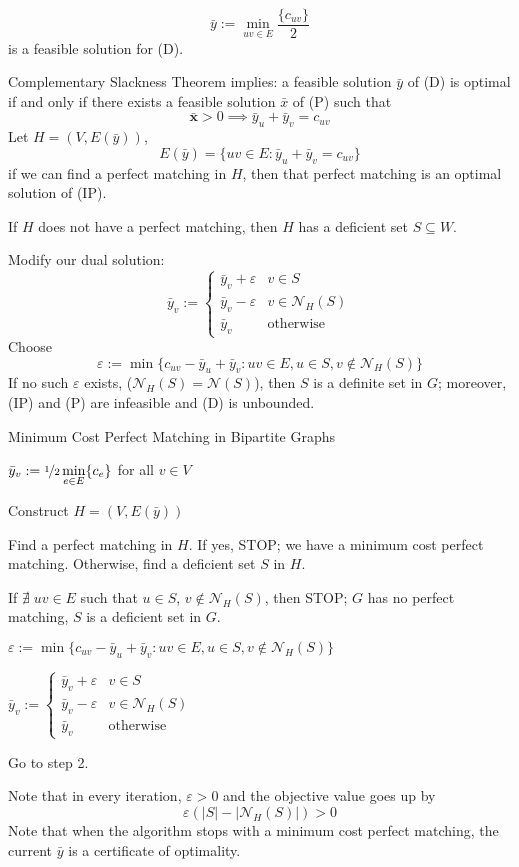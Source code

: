 \[ \bar{y}:=\min\limits_{uv\in E}\frac{\{c_{uv}\}}{2} \]
is a feasible solution for (D).

Complementary Slackness Theorem implies: a feasible solution
$ \bar{y} $ of (D) is optimal if and only if there exists a feasible
solution $ \bar{x} $ of (P) such that
\[ \bm{\bar{x}}>0\implies \bar{y}_u+\bar{y}_v=c_{uv} \]
Let $ H=(V,E(\bar{y})) $,
\[ E(\bar{y})=\{uv\in E: \bar{y}_u +\bar{y}_v=c_{uv}\} \]
if we can find a perfect matching in $ H $, then that perfect matching
is an optimal solution of (IP).

If $ H $ does not have a perfect matching, then $ H $ has a deficient
set $ S\subseteq W $.

Modify our dual solution:
\[ \bar{y}_v:=
\begin{cases}
    \bar{y}_v+\varepsilon & v\in S\\
    \bar{y}_v-\varepsilon & v\in \mathcal{N}_H(S)\\
    \bar{y}_v & \text{otherwise}
\end{cases} \]
Choose
\[ \varepsilon:=\min \{c_{uv}-\bar{y}_u+\bar{y}_v:uv\in E, u\in S, v\notin \mathcal{N}_H(S)\} \]
If no such $ \varepsilon $ exists, ($ \mathcal{N}_H(S)=\mathcal{N}(S) $),
then $ S $ is a definite set in $ G $; moreover, (IP) and (P) are infeasible
and (D) is unbounded.

\begin{algbox}
    \begin{algorithm}[H]
        \caption{Minimum Cost Perfect Matching in Bipartite Graphs}
        $ \bar{y}_v:=\nicefrac{1}{2} \min\limits_{e\in E}\{c_e\} $ for all $ v\in V $

        Construct $ H=(V,E(\bar{y})) $

        Find a perfect matching in $ H $. If yes, STOP; we have a minimum cost
        perfect matching. Otherwise, find a deficient set $ S $ in $ H $.

        If $ \nexists\;uv\in E $ such that $ u\in S $, $ v\notin \mathcal{N}_H(S) $, then STOP;
        $ G $ has no perfect matching, $ S $ is a deficient set in $ G $.

        $ \varepsilon:=\min \{c_{uv}-\bar{y}_u+\bar{y}_v:uv\in E, u\in S, v\notin \mathcal{N}_H(S)\}  $

        $ \bar{y}_v:=
        \begin{cases}
            \bar{y}_v+\varepsilon & v\in S\\
            \bar{y}_v-\varepsilon & v\in \mathcal{N}_H(S)\\
            \bar{y}_v & \text{otherwise}
        \end{cases} $

        Go to step 2.
    \end{algorithm}
\end{algbox}

Note that in every iteration, $ \varepsilon>0 $ and the objective value goes up by
\[ \varepsilon(|S|-|\mathcal{N}_H(S)|)>0 \]
Note that when the algorithm stops with a minimum cost perfect matching, the current
$ \bar{y} $ is a certificate of optimality.